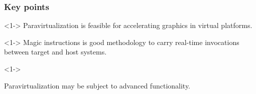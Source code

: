 
\begin{frame}
\frametitle{Key points}

\begin{thm}<1->
Paravirtualization is feasible for accelerating graphics in virtual platforms.
\end{thm}

\begin{thm}<1->
Magic instructions is good methodology to carry real-time invocations between target and host systems.
\end{thm}

\begin{thm}<1->
\begin{graytext}
Paravirtualization may be subject to advanced functionality.
\end{graytext}
\end{thm}

\end{frame}